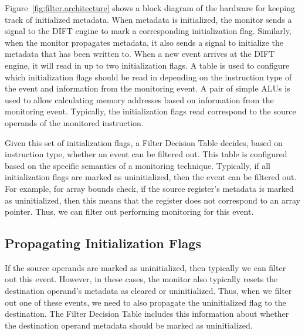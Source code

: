 Figure~\ref{fig:filter.architecture} shows a block diagram of the hardware for keeping track of
initialized metadata. When metadata is initialized, the monitor sends a signal
to the DIFT engine to mark a corresponding initialization flag. Similarly, when
the monitor propagates metadata, it also sends a signal to initialize the
metadata that has been written to. When a new event arrives at the DIFT engine,
it will read in up to two initialization flags. A table is used to configure
which initialization flags should be read in depending on the instruction type of
the event and information from the monitoring event. A pair of simple ALUs is
used to allow calculating memory addresses based on information from the
monitoring event. Typically, the initialization flags read correspond to the
source operands of the monitored instruction.

Given this set of initialization flags, a Filter Decision Table decides, based
on instruction type, whether an event can be filtered out. This table is
configured based on the specific semantics of a monitoring technique.
Typically, if all initialization flags are marked as uninitialized, then the
event can be filtered out. For example, for array bounds check, if the source
register's metadata is marked as uninitialized, then this means that the
register does not correspond to an array pointer. Thus, we can filter out
performing monitoring for this event.

\subsection{Propagating Initialization Flags}

If the source operands are marked as uninitialized, then typically we can
filter out this event. However, in these cases, the monitor also typically
resets the destination operand's metadata as cleared or uninitialized.
Thus, when we filter out one of these events, we need to also propagate the
uninitialized flag to the destination. The Filter Decision Table includes this
information about whether the destination operand metadata should be marked as
uninitialized.
